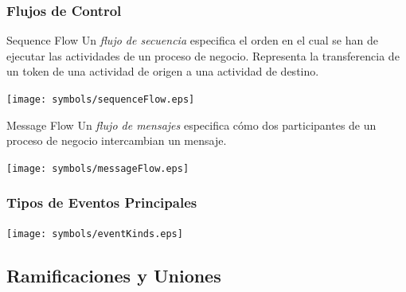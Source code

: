 \documentclass[a4paper,slidestop,xcolor=pst,blue]{beamer}
\begin{document}
\begin{frame}[c]
    \frametitle{Flujos de Control}
    \begin{block}{Sequence Flow}
        Un \emph{flujo de secuencia} especifica el orden en el cual se han de ejecutar las actividades de un proceso de negocio. Representa la transferencia de un token de una actividad de origen a una actividad de destino. 
        \ \\
        \begin{center}
            \texttt{[image: symbols/sequenceFlow.eps]}
        \end{center}
    \end{block}
    \begin{block}{Message Flow}
        Un \emph{flujo de mensajes} especifica cómo dos participantes de un proceso de negocio intercambian un mensaje. 
        \ \\
        \begin{center}
            \texttt{[image: symbols/messageFlow.eps]}
        \end{center}
    \end{block}
\end{frame}

\begin{frame}[c]
    \frametitle{Tipos de Eventos Principales}
    \begin{center}
        \texttt{[image: symbols/eventKinds.eps]}
    \end{center}
\end{frame}

\subsection{Ramificaciones y Uniones}
\end{document}
